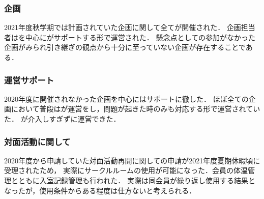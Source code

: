 \subsubsection{企画}
2021年度秋学期では計画されていた企画に関して全てが開催された．
企画担当者は\secondGrade{}を中心に\thirdGrade{}がサポートする形で運営された．
懸念点として\firstGrade{}の参加がなかった企画がみられ引き継ぎの観点から十分に至っていない企画が存在することである．

\subsubsection{運営サポート}
2020年度に開催されなかった企画を中心に\thirdGrade{}はサポートに徹した．
ほぼ全ての企画において普段は\secondGrade{}が運営をし，問題が起きた時のみ\thirdGrade{}も対応する形で運営されていた．
\thirdGrade{}が介入しすぎずに運営できた．

\subsubsection{対面活動に関して}
2020年度から申請していた対面活動再開に関しての申請が2021年度夏期休暇頃に受理されたため，
実際にサークルルームの使用が可能になった．会員の体温管理とともに入室記録管理も行われた．
実際は同会員が繰り返し使用する結果となったが，使用条件からある程度は仕方ないと考えられる．